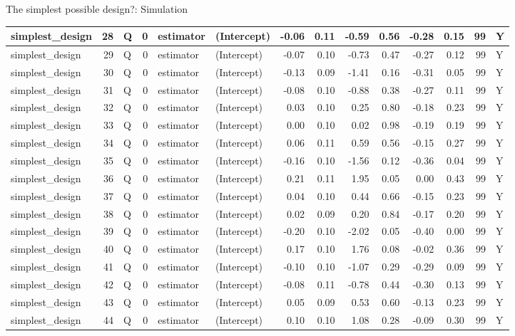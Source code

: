 \documentclass[
  11pt,
  ignorenonframetext,
]{beamer}
\begin{document}
\begin{frame}[fragile]{The simplest possible design?: Simulation}
\begin{tabular}{l|r|l|r|l|l|r|r|r|r|r|r|r|l}
\hline
simplest\_design & 28 & Q & 0 & estimator & (Intercept) & -0.06 & 0.11 & -0.59 & 0.56 & -0.28 & 0.15 & 99 & Y\\
\hline
simplest\_design & 29 & Q & 0 & estimator & (Intercept) & -0.07 & 0.10 & -0.73 & 0.47 & -0.27 & 0.12 & 99 & Y\\
\hline
simplest\_design & 30 & Q & 0 & estimator & (Intercept) & -0.13 & 0.09 & -1.41 & 0.16 & -0.31 & 0.05 & 99 & Y\\
\hline
simplest\_design & 31 & Q & 0 & estimator & (Intercept) & -0.08 & 0.10 & -0.88 & 0.38 & -0.27 & 0.11 & 99 & Y\\
\hline
simplest\_design & 32 & Q & 0 & estimator & (Intercept) & 0.03 & 0.10 & 0.25 & 0.80 & -0.18 & 0.23 & 99 & Y\\
\hline
simplest\_design & 33 & Q & 0 & estimator & (Intercept) & 0.00 & 0.10 & 0.02 & 0.98 & -0.19 & 0.19 & 99 & Y\\
\hline
simplest\_design & 34 & Q & 0 & estimator & (Intercept) & 0.06 & 0.11 & 0.59 & 0.56 & -0.15 & 0.27 & 99 & Y\\
\hline
simplest\_design & 35 & Q & 0 & estimator & (Intercept) & -0.16 & 0.10 & -1.56 & 0.12 & -0.36 & 0.04 & 99 & Y\\
\hline
simplest\_design & 36 & Q & 0 & estimator & (Intercept) & 0.21 & 0.11 & 1.95 & 0.05 & 0.00 & 0.43 & 99 & Y\\
\hline
simplest\_design & 37 & Q & 0 & estimator & (Intercept) & 0.04 & 0.10 & 0.44 & 0.66 & -0.15 & 0.23 & 99 & Y\\
\hline
simplest\_design & 38 & Q & 0 & estimator & (Intercept) & 0.02 & 0.09 & 0.20 & 0.84 & -0.17 & 0.20 & 99 & Y\\
\hline
simplest\_design & 39 & Q & 0 & estimator & (Intercept) & -0.20 & 0.10 & -2.02 & 0.05 & -0.40 & 0.00 & 99 & Y\\
\hline
simplest\_design & 40 & Q & 0 & estimator & (Intercept) & 0.17 & 0.10 & 1.76 & 0.08 & -0.02 & 0.36 & 99 & Y\\
\hline
simplest\_design & 41 & Q & 0 & estimator & (Intercept) & -0.10 & 0.10 & -1.07 & 0.29 & -0.29 & 0.09 & 99 & Y\\
\hline
simplest\_design & 42 & Q & 0 & estimator & (Intercept) & -0.08 & 0.11 & -0.78 & 0.44 & -0.30 & 0.13 & 99 & Y\\
\hline
simplest\_design & 43 & Q & 0 & estimator & (Intercept) & 0.05 & 0.09 & 0.53 & 0.60 & -0.13 & 0.23 & 99 & Y\\
\hline
simplest\_design & 44 & Q & 0 & estimator & (Intercept) & 0.10 & 0.10 & 1.08 & 0.28 & -0.09 & 0.30 & 99 & Y\\

\end{tabular}
\end{frame}
\end{document}
